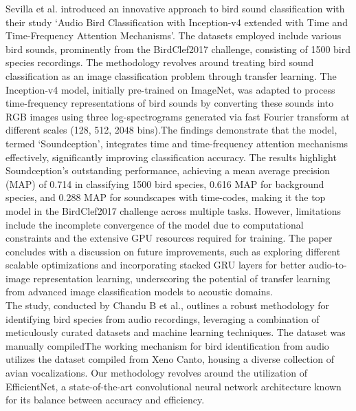 Sevilla et al.\cite{sevilla2017audio} introduced an innovative approach to bird sound classification with their study
`Audio Bird Classification with Inception-v4 extended with Time and
Time-Frequency Attention Mechanisms'. The datasets employed include
various bird sounds, prominently from the BirdClef2017 challenge, consisting of
1500 bird species recordings. The methodology revolves around treating bird
sound classification as an image classification problem through transfer
learning. The Inception-v4 model, initially pre-trained on ImageNet, was
adapted to process time-frequency representations of bird sounds by converting
these sounds into RGB images using three log-spectrograms generated via fast
Fourier transform at different scales (128, 512, 2048 bins).The findings
demonstrate that the model,
termed `Soundception', integrates time and time-frequency attention mechanisms
effectively, significantly improving classification accuracy. The results
highlight Soundception's outstanding performance, achieving a mean average
precision (MAP) of 0.714 in classifying 1500 bird species, 0.616 MAP for
background species, and 0.288 MAP for soundscapes with time-codes, making it
the top model in the BirdClef2017 challenge across multiple tasks. However,
limitations include the incomplete convergence of the model due to
computational constraints and the extensive GPU resources required for
training. The paper concludes with a discussion on future
improvements, such as exploring different scalable optimizations and
incorporating stacked GRU layers for better audio-to-image representation
learning, underscoring the potential of transfer learning from advanced image
classification models to acoustic domains.\\

The study, conducted by Chandu B et al.\cite{chandu2020automated}, 
outlines a robust methodology for identifying bird
species from audio recordings, leveraging a combination of meticulously curated
datasets and  machine learning techniques. The dataset was manually compiledThe working mechanism for bird identification from audio utilizes the dataset compiled from Xeno Canto, housing a diverse collection of avian vocalizations. 
Our methodology revolves around the utilization of EfficientNet, a state-of-the-art convolutional neural network architecture known for 
its balance between accuracy and efficiency.

